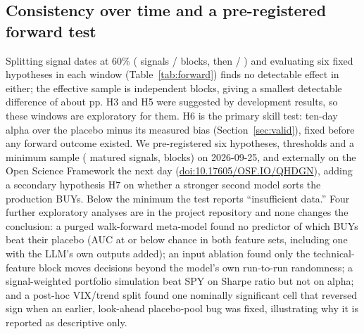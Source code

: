 \documentclass[conference]{IEEEtran}
\begin{document}
\begin{table}[t]
\centering
\caption{Sensitivity to the placebo's design (pp). LLM: alpha over the placebo, 95\% CI; No-skill: same quantity for random oversold pickers (the bias); last column: share (\%) of no-skill pickers the LLM does worse than.}
\label{tab:sens}
\footnotesize\setlength{\tabcolsep}{2pt}
\end{table}

\subsection{Consistency over time and a pre-registered forward test}
Splitting signal dates at 60\% (\fwdEarlyN{} signals / \fwdEarlyB{} blocks, then \fwdLateN{} / \fwdLateB{}) and evaluating six fixed hypotheses in each window (Table~\ref{tab:forward}) finds no detectable effect in either; the effective sample is \fwdAllB{} independent blocks, giving a smallest detectable difference of about \fwdMDE{} pp. H3 and H5 were suggested by development results, so these windows are exploratory for them. H6 is the primary skill test: ten-day alpha over the placebo minus its measured bias (Section~\ref{sec:valid}), fixed before any forward outcome existed. We pre-registered six hypotheses, thresholds and a minimum sample (\fwdNeedS{} matured signals, \fwdNeedB{} blocks) on 2026-09-25, and externally on the Open Science Framework the next day (\href{https://doi.org/10.17605/OSF.IO/QHDGN}{doi:10.17605/OSF.IO/QHDGN}), adding a secondary hypothesis H7 on whether a stronger second model sorts the production BUYs. Below the minimum the test reports ``insufficient data.'' \fwdStatusText{} Four further exploratory analyses are in the project repository and none changes the conclusion: a purged walk-forward meta-model found no predictor of which BUYs beat their placebo (AUC at or below chance in both feature sets, including one with the LLM's own outputs added); an input ablation found only the technical-feature block moves decisions beyond the model's own run-to-run randomness; a signal-weighted portfolio simulation beat SPY on Sharpe ratio but not on alpha; and a post-hoc VIX/trend split found one nominally significant cell that reversed sign when an earlier, look-ahead placebo-pool bug was fixed, illustrating why it is reported as descriptive only.
\end{document}
